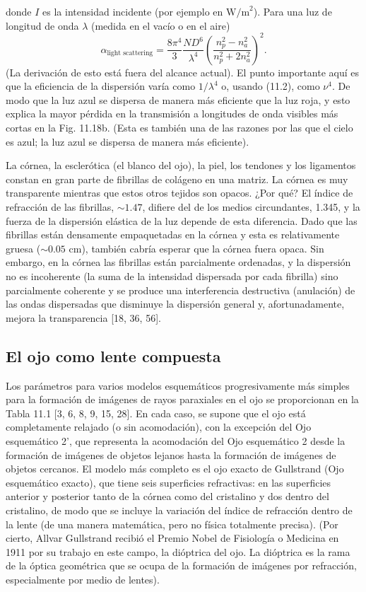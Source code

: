 \documentclass[12pt]{book}
\begin{document}
donde $I$ es la intensidad incidente (por ejemplo en $\text{W/m}^2$). Para una luz de longitud de onda $\lambda$ (medida en el vacío o en el aire)
\begin{equation}
\label{eq:11.47}
\alpha_{\text{light scattering}} = \frac{8\pi^4}{3} \frac{N D^6}{\lambda^4} \left( \frac{n_p^2 - n_a^2}{n_p^2 + 2n_a^2} \right)^2.
\end{equation}
(La derivación de esto está fuera del alcance actual). El punto importante aquí es que la eficiencia de la dispersión varía como $1/\lambda^4$ o, usando (11.2), como $\nu^4$. De modo que la luz azul se dispersa de manera más eficiente que la luz roja, y esto explica la mayor pérdida en la transmisión a longitudes de onda visibles más cortas en la Fig. 11.18b. (Esta es también una de las razones por las que el cielo es azul; la luz azul se dispersa de manera más eficiente).

La córnea, la esclerótica (el blanco del ojo), la piel, los tendones y los ligamentos constan en gran parte de fibrillas de colágeno en una matriz. La córnea es muy transparente mientras que estos otros tejidos son opacos. ¿Por qué? El índice de refracción de las fibrillas, $\sim 1.47$, difiere del de los medios circundantes, 1.345, y la fuerza de la dispersión elástica de la luz depende de esta diferencia. Dado que las fibrillas están densamente empaquetadas en la córnea y esta es relativamente gruesa ($\sim 0.05\text{ cm}$), también cabría esperar que la córnea fuera opaca. Sin embargo, en la córnea las fibrillas están parcialmente ordenadas, y la dispersión no es incoherente (la suma de la intensidad dispersada por cada fibrilla) sino parcialmente coherente y se produce una interferencia destructiva (anulación) de las ondas dispersadas que disminuye la dispersión general y, afortunadamente, mejora la transparencia [18, 36, 56].

\subsection{El ojo como lente compuesta}

Los parámetros para varios modelos esquemáticos progresivamente más simples para la formación de imágenes de rayos paraxiales en el ojo se proporcionan en la Tabla 11.1 [3, 6, 8, 9, 15, 28]. En cada caso, se supone que el ojo está completamente relajado (o sin acomodación), con la excepción del Ojo esquemático 2', que representa la acomodación del Ojo esquemático 2 desde la formación de imágenes de objetos lejanos hasta la formación de imágenes de objetos cercanos. El modelo más completo es el ojo exacto de Gullstrand (Ojo esquemático exacto), que tiene seis superficies refractivas: en las superficies anterior y posterior tanto de la córnea como del cristalino y dos dentro del cristalino, de modo que se incluye la variación del índice de refracción dentro de la lente (de una manera matemática, pero no física totalmente precisa). (Por cierto, Allvar Gullstrand recibió el Premio Nobel de Fisiología o Medicina en 1911 por su trabajo en este campo, la dióptrica del ojo. La dióptrica es la rama de la óptica geométrica que se ocupa de la formación de imágenes por refracción, especialmente por medio de lentes).
\end{document}
